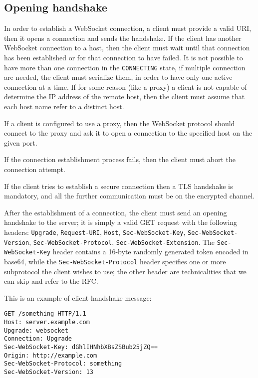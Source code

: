 \subsection{Opening handshake}
In order to establish a WebSocket connection, a client must provide a valid URI, then it opens a connection and sends the handshake.\newline
If the client has another WebSocket connection to a host, then the client must wait until that connection has been established or for that connection to have failed.\newline
It is not possible to have more than one connection in the \texttt{CONNECTING} state, if multiple connection are needed,
the client must serialize them, in order to have only one active connection at a time.\newline
If for some reason (like a proxy) a client is not capable of determine the IP address of the remote host,
then the client must assume that each host name refer to a distinct host.\newline

If a client is configured to use a proxy, then the WebSocket protocol should connect to the proxy and ask it to open a connection to the specified host on the given port.\newline

If the connection establishment process fails, then the client must abort the connection attempt.\newline

If the client tries to establish a secure connection then a TLS handshake is mandatory, and all the further communication must be on the encrypted channel.\newline

After the establishment of a connection, the client must send an opening handshake to the server; it is simply a valid GET request with the following headers: \texttt{Upgrade}, \texttt{Request-URI}, \texttt{Host}, \texttt{Sec-WebSocket-Key}, \texttt{Sec-WebSocket-Version}, \texttt{Sec-WebSocket-Protocol}, \texttt{Sec-WebSocket-Extension}.\newline
The \texttt{Sec-WebSocket-Key} header contains a 16-byte randomly generated token encoded in base64, while the \texttt{Sec-WebSocket-Protocol} header specifies one or more subprotocol the client wishes to use; the other header are technicalities that we can skip and refer to the RFC.

This is an example of client handshake message:
\begin{lstlisting}
GET /something HTTP/1.1
Host: server.example.com
Upgrade: websocket
Connection: Upgrade
Sec-WebSocket-Key: dGhlIHNhbXBsZSBub25jZQ==
Origin: http://example.com
Sec-WebSocket-Protocol: something
Sec-WebSocket-Version: 13
\end{lstlisting}

